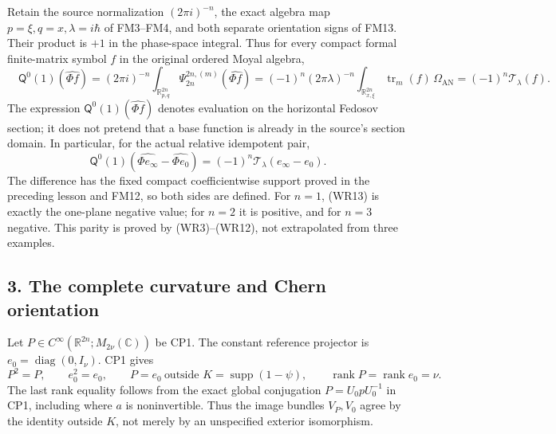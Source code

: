 \documentclass[
  11pt,
]{article}
\begin{document}
Retain the source normalization \((2\pi i)^{-n}\), the exact algebra map
\(p=\xi,q=x,\lambda=i\hbar\) of FM3--FM4, and both separate orientation
signs of FM13. Their product is \(+1\) in the phase-space integral. Thus
for every compact formal finite-matrix symbol \(f\) in the original
ordered Moyal algebra, \[
 \boxed{\quad
 \mathsf Q^0(1)(\widehat{\Phi f})
  =(2\pi i)^{-n}\int_{\mathbb R^{2n}_{p,q}}
       \Psi_{2n}^{2n,(m)}(\widehat{\Phi f})
  =(-1)^n(2\pi\lambda)^{-n}
       \int_{\mathbb R^{2n}_{x,\xi}}
           \operatorname{tr}_m(f)\,\Omega_{\mathrm{AN}}
  =(-1)^n\mathcal T_\lambda(f).
 \quad}
 \tag{WR13}
\] The expression \(\mathsf Q^0(1)(\widehat{\Phi f})\) denotes
evaluation on the horizontal Fedosov section; it does not pretend that a
base function is already in the source's section domain. In particular,
for the actual relative idempotent pair, \[
 \mathsf Q^0(1)(\widehat{\Phi e_\infty}
                      -\widehat{\Phi e_0})
   =(-1)^n\mathcal T_\lambda(e_\infty-e_0).
 \tag{WR14}
\] The difference has the fixed compact coefficientwise support proved
in the preceding lesson and FM12, so both sides are defined. For
\(n=1\), (WR13) is exactly the one-plane negative value; for \(n=2\) it
is positive, and for \(n=3\) negative. This parity is proved by
(WR3)--(WR12), not extrapolated from three examples.

\subsection{3. The complete curvature and Chern
orientation}\label{the-complete-curvature-and-chern-orientation}

Let \(P\in C^\infty(\mathbb R^{2n};M_{2\nu}(\mathbb C))\) be CP1. The
constant reference projector is \(e_0=\operatorname{diag}(0,I_\nu)\).
CP1 gives \[
 P^2=P,\qquad e_0^2=e_0,\qquad
 P=e_0\ \text{outside }K=\operatorname{supp}(1-\psi),
 \qquad \operatorname{rank}P=\operatorname{rank}e_0=\nu.
 \tag{FC1}
\] The last rank equality follows from the exact global conjugation
\(P=U_0 pU_0^{-1}\) in CP1, including where \(a\) is noninvertible. Thus
the image bundles \(V_P,V_0\) agree by the identity outside \(K\), not
merely by an unspecified exterior isomorphism.
\end{document}
